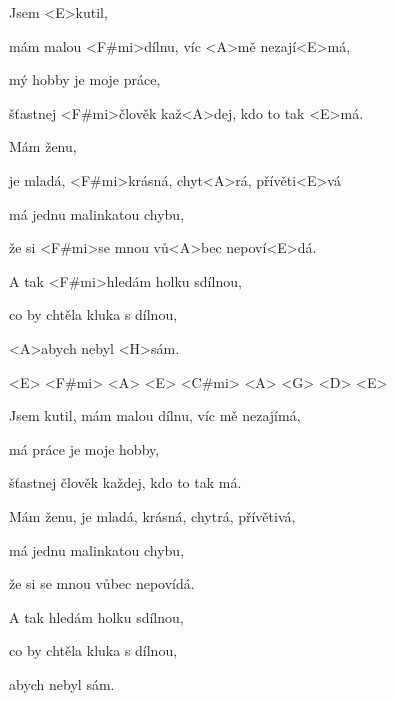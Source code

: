 

\zs
Jsem <E>kutil,

mám malou <F#mi>dílnu, víc <A>mě nezají<E>má,

mý hobby je moje práce,

šťastnej <F#mi>člověk kaž<A>dej, kdo to tak <E>má.

Mám ženu,

je mladá, <F#mi>krásná, chyt<A>rá, přívěti<E>vá

má jednu malinkatou chybu,

že si <F#mi>se mnou vů<A>bec nepoví<E>dá.
\ks

\zr
A tak <F#mi>hledám holku sdílnou,

co by chtěla kluka s dílnou,

<A>abych nebyl <H>sám.
\kr

<E> <F#mi> <A> <E> <C#mi> <A> <G> <D> <E>

\zs
Jsem kutil, mám malou dílnu, víc mě nezajímá,

má práce je moje hobby,

šťastnej člověk každej, kdo to tak má.

Mám ženu, je mladá, krásná, chytrá, přívětivá,

má jednu malinkatou chybu,

že si se mnou vůbec nepovídá.
\ks

\zr
A tak hledám holku sdílnou,

co by chtěla kluka s dílnou,

abych nebyl sám.
\kr

\kp
